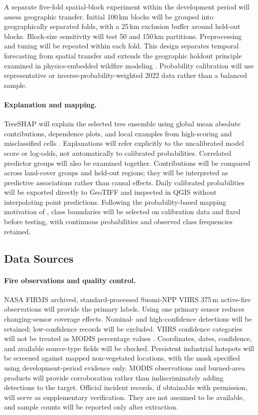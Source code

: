 \documentclass[pdflatex,sn-mathphys-num]{sn-jnl}
\begin{document}
A separate five-fold spatial-block experiment within the development period will assess geographic transfer. Initial 100\,km blocks will be grouped into geographically separated folds, with a 25\,km exclusion buffer around held-out blocks. Block-size sensitivity will test 50 and 150\,km partitions. Preprocessing and tuning will be repeated within each fold. This design separates temporal forecasting from spatial transfer and extends the geographic holdout principle examined in physics-embedded wildfire modeling \cite{jadouli2026physics}. Probability calibration will use representative or inverse-probability-weighted 2022 data rather than a balanced sample.

\paragraph{Explanation and mapping.}
TreeSHAP will explain the selected tree ensemble using global mean absolute contributions, dependence plots, and local examples from high-scoring and misclassified cells \cite{iban2024shap}. Explanations will refer explicitly to the uncalibrated model score or log-odds, not automatically to calibrated probabilities. Correlated predictor groups will also be examined together. Contributions will be compared across land-cover groups and held-out regions; they will be interpreted as predictive associations rather than causal effects. Daily calibrated probabilities will be exported directly to GeoTIFF and inspected in QGIS without interpolating point predictions. Following the probability-based mapping motivation of \cite{apostolakis2025interpretation}, class boundaries will be selected on calibration data and fixed before testing, with continuous probabilities and observed class frequencies retained.

\subsection{Data Sources}

\paragraph{Fire observations and quality control.}
NASA FIRMS archived, standard-processed Suomi-NPP VIIRS 375\,m active-fire observations will provide the primary labels. Using one primary sensor reduces changing-sensor coverage effects. Nominal- and high-confidence detections will be retained; low-confidence records will be excluded. VIIRS confidence categories will not be treated as MODIS percentage values \cite{nasaFirmsFaq}. Coordinates, dates, confidence, and available source-type fields will be checked. Persistent industrial hotspots will be screened against mapped non-vegetated locations, with the mask specified using development-period evidence only. MODIS observations and burned-area products will provide corroboration rather than indiscriminately adding detections to the target. Official incident records, if obtainable with permission, will serve as supplementary verification. They are not assumed to be available, and sample counts will be reported only after extraction.
\end{document}
